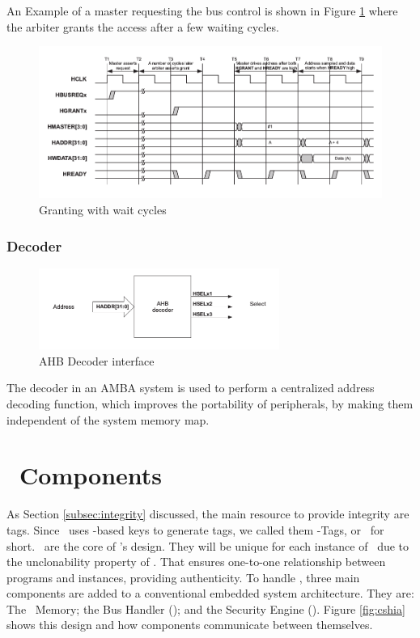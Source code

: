 An Example of a master requesting the bus control is shown in Figure \ref{fig:grantwait} where the arbiter grants the access after a few waiting cycles.
 \begin{figure}[ht]
    \centering
    \includegraphics[width=\textwidth]{figures/others/arbiter_grant_wait.png}
    \caption{Granting with wait cycles}
    \label{fig:grantwait}
\end{figure}


\subsubsection{Decoder}
\begin{figure}[ht]
    \centering
    \includegraphics[width=0.7\textwidth]{figures/others/decoder_ahb.png}
    \caption{AHB Decoder interface}
    \label{fig:decoder int}
\end{figure}
 The decoder in an AMBA system is used to perform a centralized address decoding function, which improves the portability of peripherals, by making them independent of the system memory map.

 



\section{\cshia~Components}
\label{sec:Components-of-the-Architecture}
As Section \ref{subsec:integrity} discussed, the main resource to provide integrity are tags. Since \cshia~uses \puf-based keys to generate tags, we called them \puf-Tags, or \ptags~for short. \ptags~are the core of \cshia's design. They will be unique for each instance of \cshia~due to the unclonability property of \pufs. That ensures one-to-one relationship between programs and instances, providing authenticity. To handle \ptags, three main components are added to a conventional embedded system architecture. They are: The \ptag~Memory; the Bus Handler (\handler); and the Security Engine (\seceng). Figure \ref{fig:cshia} shows this design and how components communicate between themselves. 

